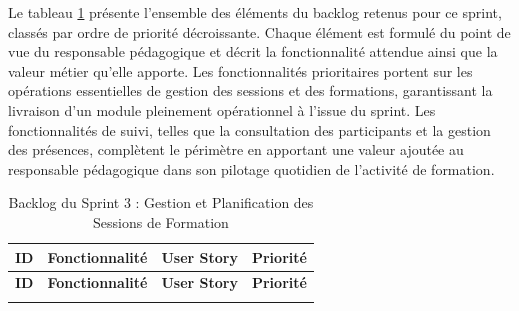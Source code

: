 Le tableau \ref{tab:sprint3_backlog}  présente l'ensemble des éléments du backlog retenus pour ce sprint, classés par ordre de priorité décroissante. Chaque élément est formulé du point de vue du responsable pédagogique et décrit la fonctionnalité attendue ainsi que la valeur métier qu'elle apporte. Les fonctionnalités prioritaires portent sur les opérations essentielles de gestion des sessions et des formations, garantissant la livraison d'un module pleinement opérationnel à l'issue du sprint. Les fonctionnalités de suivi, telles que la consultation des participants et la gestion des présences, complètent le périmètre en apportant une valeur ajoutée au responsable pédagogique dans son pilotage quotidien de l'activité de formation.
\vspace{0.2cm}
\setlength{\LTpre}{0pt}
\setlength{\LTpost}{0pt}
{
\begin{longtable}{|c|p{3.5cm}|p{8.5cm}|c|}
\caption{Backlog du Sprint 3 : Gestion et Planification des Sessions de Formation}
\label{tab:sprint3_backlog} \\
\hline
\textbf{ID} & \textbf{Fonctionnalité} & \textbf{User Story} & \textbf{Priorité} \\
\hline
\endfirsthead
\hline
\textbf{ID} & \textbf{Fonctionnalité} & \textbf{User Story} & \textbf{Priorité} \\
\hline
\endhead
\endfoot
\hline
\endlastfoot


\end{longtable}}
